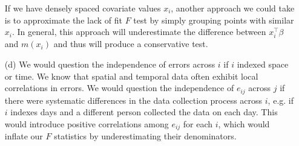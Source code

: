 \begin{itemize}
If we have densely spaced covariate values $x_i$, another approach we could take is to approximate the lack of fit $F$ test by simply grouping points with similar $x_i$. In general, this approach will underestimate the difference between $x_i^\top \beta$ and $m(x_i)$ and thus will produce a conservative test.

\item[(d)] We would question the independence of errors across $i$ if $i$ indexed space or time. We know that spatial and temporal data often exhibit local correlations in errors. We would question the independence of $e_{ij}$ across $j$ if there were systematic differences in the data collection process across $i$, e.g. if $i$ indexes days and a different person collected the data on each day. This would introduce positive correlations among $e_{ij}$ for each $i$, which would inflate our $F$ statistics by underestimating their denominators.

\end{itemize}
